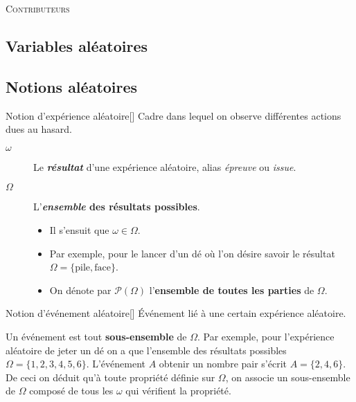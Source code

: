 \documentclass[10pt, french]{report}
\begin{document}
\begin{center}
	\textsc{\Large Contributeurs}\\[0.5cm] 
\end{center}
%

\newpage
\raggedcolumns
\begin{multicols*}{2}
\chapter{Variables aléatoires}
\section{Notions aléatoires}
\begin{definitionGENERAL}{Notion d'expérience aléatoire}[]
Cadre dans lequel on observe différentes actions dues au hasard.

\begin{distributions}[Notation]
\begin{description}
	\item[$\omega$]	Le \textbf{\textit{résultat}} d'une expérience aléatoire, alias \textit{épreuve} ou \textit{issue}.
	\item[$\Omega$]	L'\textbf{\textit{ensemble} des résultats possibles}.
		\begin{itemize}
		\item	Il s'ensuit que $\omega \in \Omega$.
		\item	Par exemple, pour le lancer d'un dé où l'on désire savoir le résultat $\Omega = \{\text{pile}, \text{face}\}$.
		\item	On dénote par $\mathcal{P}(\Omega)$ l'\textbf{ensemble de toutes les parties} de $\Omega$.
		\end{itemize}
\end{description}
\end{distributions}
\end{definitionGENERAL}

\begin{definitionGENERAL}{Notion d'événement aléatoire}[]
Événement lié à une certain expérience aléatoire. 

\bigskip	

Un événement est tout \textbf{sous-ensemble} de $\Omega$. Par exemple, pour l'expérience aléatoire de jeter un dé on a que l'ensemble des résultats possibles $\Omega = \{1, 2, 3, 4, 5, 6\}$. L'événement $A$ \og obtenir un nombre pair \fg{} s'écrit $A = \{2, 4, 6\}$. De ceci on déduit qu'à toute propriété définie sur $\Omega$, on associe un sous-ensemble de $\Omega$ composé de tous les $\omega$ qui vérifient la propriété. 
\end{definitionGENERAL}


\end{multicols*}
\end{document}

